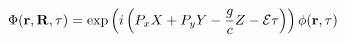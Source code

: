 \begin{equation}\Phi(\mathbf{r},\mathbf{R},\tau)=\exp\left(i\left(P_xX+P_yY-\frac{g}{c}Z-\cal
E\tau\right)\right)
  \phi(\mathbf{r},\tau) \label{e3} \end{equation}

